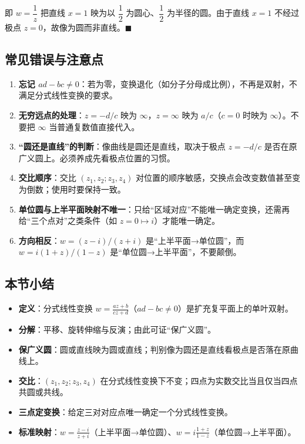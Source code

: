 即 \(w=\dfrac{1}{z}\) 把直线 \(x=1\) 映为以 \(\dfrac12\)
为圆心、\(\dfrac12\) 为半径的圆。由于直线 \(x=1\) 不经过极点
\(z=0\)，故像为圆而非直线。\(\blacksquare\)

\subsection{常见错误与注意点}\label{ux5e38ux89c1ux9519ux8befux4e0eux6ce8ux610fux70b9-18}

\begin{enumerate}
\def\labelenumi{\arabic{enumi}.}
\tightlist
\item
  \textbf{忘记
  \(ad-bc\neq 0\)}：若为零，变换退化（如分子分母成比例），不再是双射，不满足分式线性变换的要求。
\item
  \textbf{无穷远点的处理}：\(z=-d/c\) 映为 \(\infty\)，\(z=\infty\) 映为
  \(a/c\)（\(c=0\) 时映为 \(\infty\)）。不要把 \(\infty\)
  当普通复数值直接代入。
\item
  \textbf{``圆还是直线''的判断}：像曲线是圆还是直线，取决于极点
  \(z=-d/c\) 是否在原广义圆上。必须养成先看极点位置的习惯。
\item
  \textbf{交比顺序}：交比 \((z_1,z_2;z_3,z_4)\)
  对位置的顺序敏感，交换点会改变数值甚至变为倒数；使用时要保持一致。
\item
  \textbf{单位圆与上半平面映射不唯一}：只给``区域对应''不能唯一确定变换，还需再给``三个点对''之类条件（如
  \(z=0\mapsto i\)）才能唯一确定。
\item
  \textbf{方向相反}：\(w=(z-i)/(z+i)\) 是``上半平面→单位圆''，而
  \(w=i(1+z)/(1-z)\) 是``单位圆→上半平面''，不要颠倒。
\end{enumerate}

\subsection{本节小结}\label{ux672cux8282ux5c0fux7ed3-18}

\begin{itemize}
\tightlist
\item
  \textbf{定义}：分式线性变换
  \(w=\frac{az+b}{cz+d}\)（\(ad-bc\neq0\)）是扩充复平面上的单叶双射。
\item
  \textbf{分解}：平移、旋转伸缩与反演；由此可证``保广义圆''。
\item
  \textbf{保广义圆}：圆或直线映为圆或直线；判别像为圆还是直线看极点是否落在原曲线上。
\item
  \textbf{交比}：\((z_1,z_2;z_3,z_4)\)
  在分式线性变换下不变；四点为实数交比当且仅当四点共圆或共线。
\item
  \textbf{三点定变换}：给定三对对应点唯一确定一个分式线性变换。
\item
  \textbf{标准映射}：\(w=\frac{z-i}{z+i}\)（上半平面→单位圆）、\(w=i\frac{1+z}{1-z}\)（单位圆→上半平面）。
\end{itemize}

